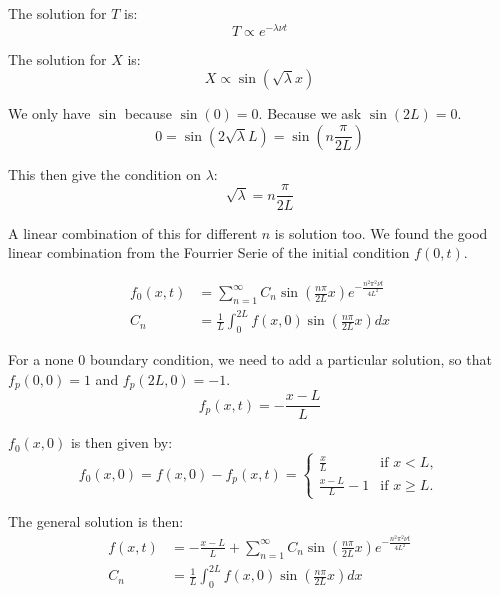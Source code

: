 The solution for $T$ is:
\begin{equation}
  T\propto e^{-\lambda \nu t}
\end{equation}

The solution for $X$ is:
\begin{equation}
	X\propto \sin(\sqrt{\lambda} x)
\end{equation}

We only have $\sin$ because $\sin(0)=0$.
Because we ask $\sin(2L)=0$.
\begin{equation}
	0=\sin(2\sqrt{\lambda} L)=\sin\left(n\frac{\pi}{2L}\right)
\end{equation}

This then give the condition on $\lambda$:
\begin{equation}
	\sqrt{\lambda}=n\frac{\pi}{2L}
\end{equation}

A linear combination of this for different $n$ is solution too.
We found the good linear combination from the Fourrier Serie of the initial condition $f(0,t)$.

\begin{align}
  f_0(x,t)&=\sum_{n=1}^{\infty}C_{n}\sin\left(\frac{n\pi}{2L}x\right)e^{-\frac{n^2\pi^2\nu t}{4L^2}}\\
  C_{n}&=\frac{1}{L}\int_{0}^{2L}f(x,0)\sin\left(\frac{n\pi}{2L}x\right) dx
\end{align}

For a none 0 boundary condition, we need to add a particular solution, so that $f_p(0,0)=1$ and $f_p(2L,0)=-1$.
\begin{equation}
	f_{p}(x,t)=-\frac{x-L}{L}
\end{equation}

$f_{0}(x,0)$ is then given by:
\begin{equation}
  f_{0}(x,0)=f(x,0)-f_{p}(x,t)=\begin{cases}
                               	\frac{x}{L}&\text{if $x<L$},\\
                               	\frac{x-L}{L}-1&\text{if $x\geq L$.}
                               \end{cases}
\end{equation}

The general solution is then:
\begin{align}
  f(x,t)&=-\frac{x-L}{L}+\sum_{n=1}^{\infty}C_{n}\sin\left(\frac{n\pi}{2L}x\right)e^{-\frac{n^2\pi^2\nu t}{4L^2}}\\
  C_{n}&=\frac{1}{L}\int_{0}^{2L}f(x,0)\sin\left(\frac{n\pi}{2L}x\right) dx
\end{align}

